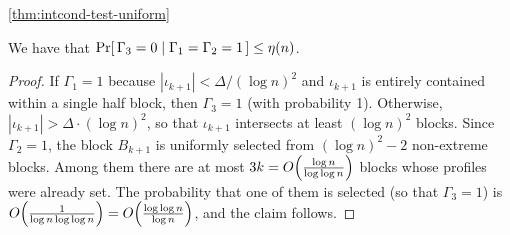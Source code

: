 \begin{proofof}{\cref{thm:intcond-test-uniform}}
\begin{claim}\label{claim:adapt:proba:gamma:3}
We have that $\Pr\!\left[\,  \Gamma_3 = 0  \;\middle\vert\;  \Gamma_1 = \Gamma_2 = 1 \, \right] \leq \eta(n)$.
\end{claim}
\begin{proof}
If $\Gamma_1=1$ because $|\iota_{k+1}| < \Delta/(\log n)^2$ and
$\iota_{k+1}$ is  entirely contained within a single
 half block, then $\Gamma_3 = 1$ (with probability 1).
 Otherwise, $|\iota_{k+1}| > \Delta \cdot (\log n)^2$, so that
$\iota_{k+1}$ intersects at least $(\log n)^2$ blocks. Since $\Gamma_2=1$,
the block $B_{k+1}$ is uniformly selected from $(\log n)^2-2$ non-extreme blocks.
Among them there are at most $3k = \bigO{ {\frac {\log n}{\log\log  n}} }$ blocks
whose profiles were already set. The probability that one of them is selected
(so that $\Gamma_3=1$) is $\bigO{ {\frac {1}{\log n\log \log n}} } = \bigO{ {\frac {\log \log n}{\log n}} }$, and the claim follows.
\end{proof}


\end{proofof}
